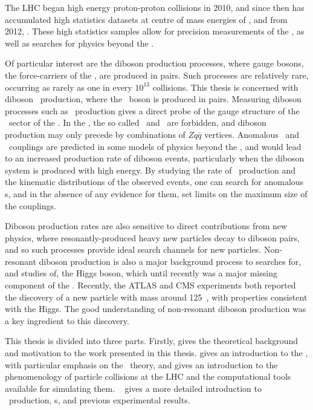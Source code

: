 \graphicspath{{Chapters/Introduction/Figures/}}
The LHC began high energy proton-proton collisions in 2010, and since then
has accumulated high statistics datasets at centre of mass energies of
, and from 2012, . These high statistics samples
allow for precision measurements of the \sm, as well as searches for
physics beyond the \sm. 

Of particular interest are the diboson production processes, where gauge bosons,
the force-carriers of the \sm, are produced in pairs. Such processes are
relatively rare, occurring as rarely as one in every $10^{13}$
collisions. This thesis is concerned with diboson \ZZ\ production, where
the \Z\ boson is produced in pairs.
Measuring diboson processes such as \ZZ\ production gives a direct probe of the gauge structure of
the \ew\ sector of the \sm. In the \sm, the so called  \ZZZ\ and \ZZg\ are forbidden, and diboson production may
only precede by combinations of $Zq\bar{q}$ vertices. Anomalous \ZZZ\ and \ZZg\ couplings are
predicted in some models of physics beyond the \sm, and would lead to an
increased production rate of diboson events, particularly when the diboson
system is produced with high energy. By studying the rate of \ZZ\ production and
the kinematic distributions of the observed events, one can search for anomalous
\TGC s, and in the absence of any evidence for them, set limits on the maximum
size of the couplings.

Diboson production rates are also sensitive to direct contributions from new
physics, where resonantly-produced heavy new particles decay to diboson pairs, and so such
processes provide ideal search channels for new particles. Non-resonant diboson
production is also a major background process to searches for, and studies of,
the Higgs boson, which until recently was a major missing component of the \sm.
Recently, the ATLAS and CMS experiments both reported the discovery of a new
particle with mass around 125~\gev, with properties consistent with the Higgs.
The good understanding of non-resonant diboson production was a key ingredient
to this discovery. 

This thesis is divided into three parts. Firstly,  gives the theoretical background
and motivation to the work presented in this thesis.  gives an
introduction to the \sm, with particular emphasis on the \ew\ theory, and gives
an introduction to the phenomenology of particle collisions at the LHC and the
computational tools available for simulating them. ~ gives a more
detailed introduction to \ZZ\ production, \TGC s, and previous experimental
results.


